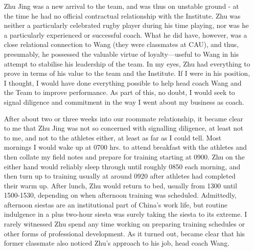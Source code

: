   Zhu Jing was a new arrival to the team, and was thus on unstable ground - at the time he had no official contractual relationship with the Institute.  Zhu was neither a particularly celebrated rugby player during his time playing, nor was he a particularly experienced or successful coach.  What he did have, however, was a close relational connection to Wang (they were classmates at CAU), and thus, presumably, he possessed the valuable virtue of loyalty---useful to Wang in his attempt to stabilise his leadership of the team.  In my eyes, Zhu had everything to prove in terms of his value to the team and the Institute.  If I were in his position, I thought, I would have done everything possible to help head coach Wang and the Team to improve performance.  As part of this, no doubt, I would seek to signal diligence and commitment in the way I went about my business as coach.

  After about two or three weeks into our roommate relationship, it became clear to me that Zhu Jing was not so concerned with signalling diligence, at least not to me, and not to the athletes either, at least as far as I could tell.  Most mornings I would wake up at 0700 hrs. to attend breakfast with the athletes and then collate my field notes and prepare for training starting at 0900. Zhu on the either hand would reliably sleep through until roughly 0850 each morning, and then turn up to training usually at around 0920 after athletes had completed their warm up.  After lunch, Zhu would return to bed, usually from 1300 until 1500-1530, depending on when afternoon training was scheduled. Admittedly, afternoon siestas are an institutional part of China's work life, but routine indulgence in a plus two-hour siesta was surely taking the siesta to its extreme.  I rarely witnessed Zhu spend any time working on preparing training schedules or other forms of professional development.  As it turned out, became clear that his former classmate also noticed Zhu's approach to his job, head coach Wang.

